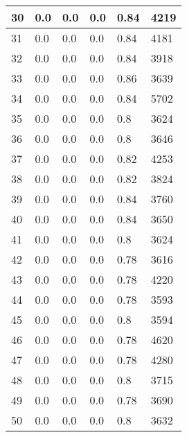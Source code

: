 \begin{longtable}{|l|l|l|l|l|l|}
30 & 0.0 & 0.0 & 0.0 & 0.84 & 4219 \\ \hline 
31 & 0.0 & 0.0 & 0.0 & 0.84 & 4181 \\ \hline 
32 & 0.0 & 0.0 & 0.0 & 0.84 & 3918 \\ \hline 
33 & 0.0 & 0.0 & 0.0 & 0.86 & 3639 \\ \hline 
34 & 0.0 & 0.0 & 0.0 & 0.84 & 5702 \\ \hline 
35 & 0.0 & 0.0 & 0.0 & 0.8 & 3624 \\ \hline 
36 & 0.0 & 0.0 & 0.0 & 0.8 & 3646 \\ \hline 
37 & 0.0 & 0.0 & 0.0 & 0.82 & 4253 \\ \hline 
38 & 0.0 & 0.0 & 0.0 & 0.82 & 3824 \\ \hline 
39 & 0.0 & 0.0 & 0.0 & 0.84 & 3760 \\ \hline 
40 & 0.0 & 0.0 & 0.0 & 0.84 & 3650 \\ \hline 
41 & 0.0 & 0.0 & 0.0 & 0.8 & 3624 \\ \hline 
42 & 0.0 & 0.0 & 0.0 & 0.78 & 3616 \\ \hline 
43 & 0.0 & 0.0 & 0.0 & 0.78 & 4220 \\ \hline 
44 & 0.0 & 0.0 & 0.0 & 0.78 & 3593 \\ \hline 
45 & 0.0 & 0.0 & 0.0 & 0.8 & 3594 \\ \hline 
46 & 0.0 & 0.0 & 0.0 & 0.78 & 4620 \\ \hline 
47 & 0.0 & 0.0 & 0.0 & 0.78 & 4280 \\ \hline 
48 & 0.0 & 0.0 & 0.0 & 0.8 & 3715 \\ \hline 
49 & 0.0 & 0.0 & 0.0 & 0.78 & 3690 \\ \hline 
50 & 0.0 & 0.0 & 0.0 & 0.8 & 3632 \\ \hline 
\end{longtable}